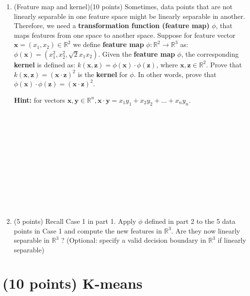 \documentclass[12pt]{article}%
\begin{document}
\begin{enumerate}
    \item (Feature map and kernel)(10 points) Sometimes, data points that are not linearly separable in one feature space might be linearly separable in another. Therefore, we need a \textbf{transformation function (feature map)} $\phi$, that maps features from one space to another space. Suppose for feature vector $\mathbf{x}=\left(x_{1}, x_{2}\right) \in \mathbb{R}^{2}$ we define \textbf{feature map} $\phi: \mathbb{R}^{2} \rightarrow \mathbb{R}^{3}$ as: $\phi(\mathbf{x})=\left(x_{1}^{2}, x_{2}^{2}, \sqrt{2} x_{1} x_{2}\right)$. Given the \textbf{feature map} $\phi$, the corresponding \textbf{kernel} is defined as: $k(\mathbf{x}, \mathbf{z})=\phi(\mathbf{x}) \cdot \phi(\mathbf{z})$, where $\mathbf{x}, \mathbf{z} \in \mathbb{R}^{2}$. Prove that $k(\mathbf{x}, \mathbf{z})=(\mathbf{x} \cdot \mathbf{z})^{2}$ is the \textbf{kernel} for $\phi .$ In other words, prove that $\phi(\mathbf{x}) \cdot \phi(\mathbf{z})=(\mathbf{x} \cdot \mathbf{z})^{2}$.
    
    \textbf{Hint:} for vectors $\mathbf{x}, \mathbf{y} \in \mathbb{R}^{n}, \mathbf{x} \cdot \mathbf{y}=x_{1} y_{1}+x_{2} y_{2}+\ldots+x_{n} y_{n}$.
    \\
    \\
    \\
    \\
    \\
    \\
    \\
    \\
    \\
    \\
    \\
    \\

    \item (5 points) Recall Case 1 in part 1. Apply $\phi$ defined in part 2 to the 5 data points in Case 1 and compute the new features in $\mathbb{R}^{3}$. Are they now linearly separable in $\mathbb{R}^{3}$ ? (Optional: specify a valid decision boundary in $\mathbb{R}^{3}$ if linearly separable)
    
    \newpage

\end{enumerate}



\section{(10 points) K-means}
\end{document}
